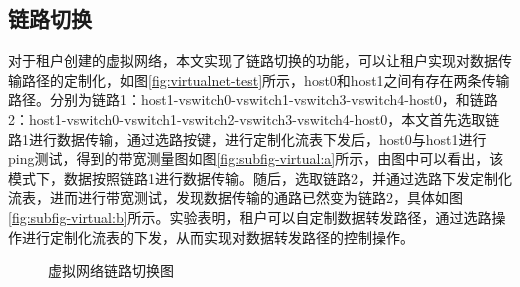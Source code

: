 \subsection{链路切换}
对于租户创建的虚拟网络，本文实现了链路切换的功能，可以让租户实现对数据传输路径的定制化，如图\ref{fig:virtualnet-test}所示，host0和host1之间有存在两条传输路径。分别为链路1：host1-vswitch0-vswitch1-vswitch3-vswitch4-host0，和链路2：host1-vswitch0-vswitch1-vswitch2-vswitch3-vswitch4-host0，本文首先选取链路1进行数据传输，通过选路按键，进行定制化流表下发后，host0与host1进行ping测试，得到的带宽测量图如图\ref{fig:subfig-virtual:a}所示，由图中可以看出，该模式下，数据按照链路1进行数据传输。随后，选取链路2，并通过选路下发定制化流表，进而进行带宽测试，发现数据传输的通路已然变为链路2，具体如图\ref{fig:subfig-virtual:b}所示。实验表明，租户可以自定制数据转发路径，通过选路操作进行定制化流表的下发，从而实现对数据转发路径的控制操作。

\begin{figure}
 \centering
 \caption{虚拟网络链路切换图}
 \label{fig:customlink} %
\end{figure}
